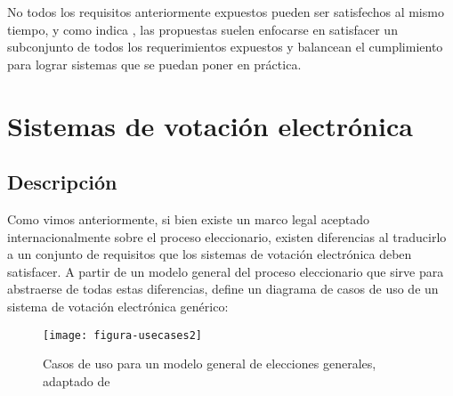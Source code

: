 No todos los requisitos anteriormente expuestos pueden ser satisfechos al mismo tiempo, y como 
indica \cite{Langer2010}, las propuestas suelen enfocarse en satisfacer un subconjunto 
de todos los requerimientos expuestos y balancean el cumplimiento para lograr
sistemas que se puedan poner en práctica.


\newpage
\section{Sistemas de votación electrónica}

\subsection{Descripción}

Como vimos anteriormente, si bien existe un marco legal aceptado internacionalmente
sobre el proceso eleccionario, existen diferencias al traducirlo a un conjunto de requisitos que los sistemas de votación
electrónica deben satisfacer. A partir de un modelo general del proceso eleccionario 
que sirve para abstraerse de todas estas diferencias, \cite{Ikonomopoulos2002} define un 
diagrama de casos de uso de un sistema de votación electrónica genérico:

\begin{figure}[h!]
	\centering
	\texttt{[image: figura-usecases2]}
	\caption[Casos de uso para un modelo general de elecciones generales]{Casos de uso para un modelo general de elecciones generales, adaptado de \cite{Ikonomopoulos2002}}
	\label{fig:casos-uso}
\end{figure}

